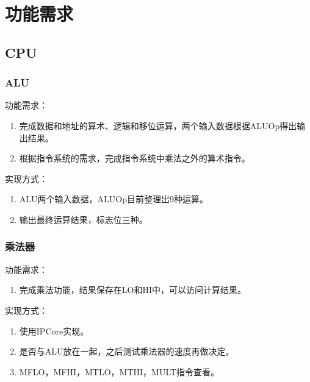 \section{功能需求}
    \subsection{CPU}
        \subsubsection{ALU}
            功能需求：
            \begin{enumerate}
            \item
            完成数据和地址的算术、逻辑和移位运算，两个输入数据根据ALUOp得出输出结果。
            \item
            根据指令系统的需求，完成指令系统中乘法之外的算术指令。
            \end{enumerate}

            实现方式：
            \begin{enumerate}
            \item
            ALU两个输入数据，ALUOp目前整理出9种运算。
            \item
            输出最终运算结果，标志位三种。
            \end{enumerate}

        \subsubsection{乘法器}
            功能需求：
            \begin{enumerate}
            \item
            完成乘法功能，结果保存在LO和HI中，可以访问计算结果。
            \end{enumerate}

            实现方式：
            \begin{enumerate}
                \item
            使用IPCore实现。
            \item
            是否与ALU放在一起，之后测试乘法器的速度再做决定。
            \item
            MFLO，MFHI，MTLO，MTHI，MULT指令查看。
            \end{enumerate}

